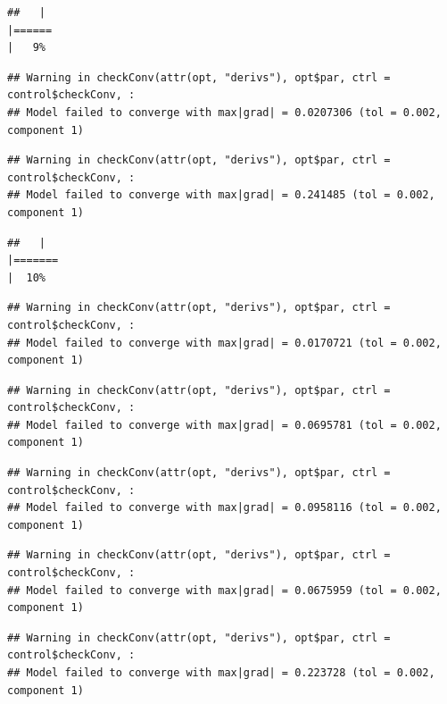 \documentclass[
  12pt,
]{book}
\begin{document}
\begin{verbatim}
##   |                                                                              |======                                                                |   9%
\end{verbatim}

\begin{verbatim}
## Warning in checkConv(attr(opt, "derivs"), opt$par, ctrl = control$checkConv, :
## Model failed to converge with max|grad| = 0.0207306 (tol = 0.002, component 1)
\end{verbatim}

\begin{verbatim}
## Warning in checkConv(attr(opt, "derivs"), opt$par, ctrl = control$checkConv, :
## Model failed to converge with max|grad| = 0.241485 (tol = 0.002, component 1)
\end{verbatim}

\begin{verbatim}
##   |                                                                              |=======                                                               |  10%
\end{verbatim}

\begin{verbatim}
## Warning in checkConv(attr(opt, "derivs"), opt$par, ctrl = control$checkConv, :
## Model failed to converge with max|grad| = 0.0170721 (tol = 0.002, component 1)
\end{verbatim}

\begin{verbatim}
## Warning in checkConv(attr(opt, "derivs"), opt$par, ctrl = control$checkConv, :
## Model failed to converge with max|grad| = 0.0695781 (tol = 0.002, component 1)
\end{verbatim}

\begin{verbatim}
## Warning in checkConv(attr(opt, "derivs"), opt$par, ctrl = control$checkConv, :
## Model failed to converge with max|grad| = 0.0958116 (tol = 0.002, component 1)
\end{verbatim}

\begin{verbatim}
## Warning in checkConv(attr(opt, "derivs"), opt$par, ctrl = control$checkConv, :
## Model failed to converge with max|grad| = 0.0675959 (tol = 0.002, component 1)
\end{verbatim}

\begin{verbatim}
## Warning in checkConv(attr(opt, "derivs"), opt$par, ctrl = control$checkConv, :
## Model failed to converge with max|grad| = 0.223728 (tol = 0.002, component 1)
\end{verbatim}
\end{document}

